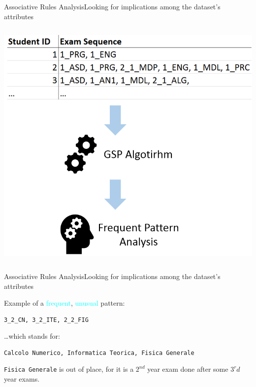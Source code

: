 \begin{frame}{Associative Rules Analysis}{Looking for implications among the dataset's attributes}
\begin{columns}
\begin{column}{0.5\textwidth}
    \hspace*{-0.5cm}\includegraphics[scale=0.21]{seq3.png}
\end{column}
\end{columns}

\end{frame}

\begin{frame}{Associative Rules Analysis}{Looking for implications among the dataset's attributes}

    \alert{Example} of a \textcolor{cyan}{frequent}, \textcolor{cyan}{unusual} pattern: \\

	\vspace{0.3cm}
	\begin{centering}
		\texttt{3\_2\_CN, 3\_2\_ITE, 2\_2\_FIG}\\
	\end{centering}
	\vspace{0.3cm}

	\ldots which stands for:

	\vspace{0.3cm}
	\begin{centering}
	\texttt{Calcolo Numerico, Informatica Teorica, Fisica Generale}\\
	\end{centering}
	\vspace{0.6cm}

	\texttt{Fisica Generale} is \alert{out of place}, for it is a $2^{nd}$ year exam done after some $3^r{d}$ year exams.\\

\end{frame}

